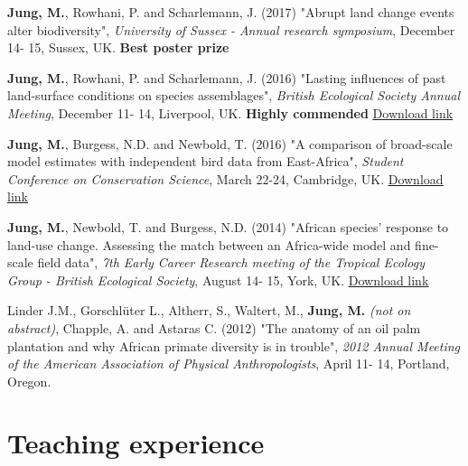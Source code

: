 \documentclass[12pt,a4paper,serif]{moderncv}        %
\begin{document}
\begin{bibenum}
    
    \item \textbf{Jung, M.}, Rowhani, P. and Scharlemann, J. (2017) "Abrupt land change events alter biodiversity", \emph{University of Sussex - Annual research symposium}, December 14- 15, Sussex, UK. \textbf{Best poster prize}

    \item \textbf{Jung, M.}, Rowhani, P. and Scharlemann, J. (2016) "Lasting influences of past land-surface conditions on species assemblages", \emph{British Ecological Society Annual Meeting}, December 11- 14, Liverpool, UK. \textbf{Highly commended} \href{https://figshare.com/articles/Lasting_influences_of_past_land-surface_conditions_on_species_assemblages/7155029}{\underline{Download link}}

    \item \textbf{Jung, M.}, Burgess, N.D. and Newbold, T. (2016) "A comparison of broad-scale model estimates with independent bird data from East-Africa", \emph{Student Conference on Conservation Science}, March 22-24, Cambridge, UK. \href{https://figshare.com/articles/A_comparison_of_broad-scale_model_estimates_with_independent_bird_data_from_East-Africa/4231379}{\underline{Download link}}

    \item \textbf{Jung, M.}, Newbold, T. and Burgess, N.D. (2014) "African species' response to land-use change. Assessing the match between an Africa-wide model and fine-scale field data", \emph{7th Early Career Research meeting of the Tropical Ecology Group - British Ecological Society}, August 14- 15, York, UK. \href{https://figshare.com/articles/African_species_response_to_land_use_change_Assessing_the_match_between_an_Africa_wide_model_and_fine_scale_field_data/1613887}{\underline{Download link}}

    \item Linder J.M., Gorschl\"{u}ter L., Altherr, S., Waltert, M., \textbf{Jung, M.} {\small \emph{(not on abstract)}}, Chapple, A. and Astaras C. (2012) "The anatomy of an oil palm plantation and why African primate diversity is in trouble", \emph{2012 Annual Meeting of the American Association of Physical Anthropologists}, April 11- 14, Portland, Oregon.

\end{bibenum}

\section{Teaching experience}
\end{document}
